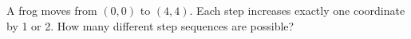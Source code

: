 A frog moves from $(0,0)$ to $(4,4)$. Each step increases exactly one coordinate by 1 or 2. How many different step sequences are possible?
